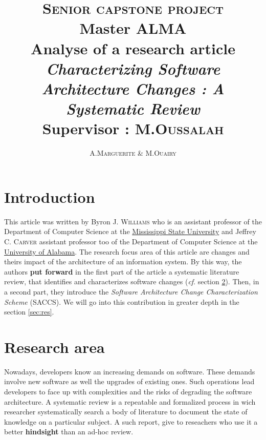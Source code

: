 \documentclass[12pt]{article}
\title{ {\huge \textsc{Senior capstone project}} \\  Master ALMA  \\ \textbf{Analyse of a research article} \\ \emph{Characterizing Software Architecture Changes : A Systematic Review}\\{\small Supervisor :  M.\textsc{Oussalah}}}
\author{A.\textsc{Marguerite} \& M.\textsc{Ouairy}}
\newcommand{\cf}{\emph{cf}.}
\begin{document}
\maketitle
\renewcommand{\labelitemi}{$\bullet$} 



\section{Introduction}\label{sec:intro}
This article was written by Byron J. \textsc{Williams} who is an assistant professor of the Department of Computer Science at the \href{http://www.msstate.edu/}{Mississippi State University} and Jeffrey C. \textsc{Carver} assistant professor too of the Department of Computer Science at the \href{http://www.ua.edu/}{University of Alabama}. The research focus area of this article are changes and theirs impact of the architecture of an information system. By this way, the authors \textbf{put forward} in the first part of the article a systematic literature review, that identifies and characterizes software changes (\cf{} section \ref{sec:pblm}). Then, in a second part, they introduce the \emph{Software Architecture Change Characterization Scheme} (SACCS). We will go into this contribution in greater depth in the section \ref{sec:res}. 



\section{Research area}\label{sec:pblm}
Nowadays, developers know an increasing demands on software. These demands involve new software as well the upgrades of existing ones. Such operations lead developers to face up with complexities and the risks of degrading the software architecture. A systematic review is a repeatable and formalized process in wich researcher systematically search a body of literature to document the state of knowledge on a particular subject. A such report, give to reseachers who use it a better \textbf{hindsight} than an ad-hoc review.%
\end{document}
